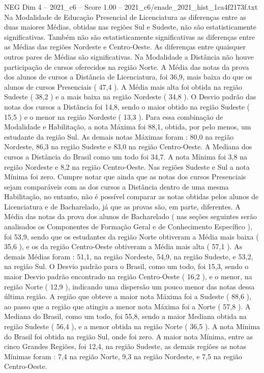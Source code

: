 \begin{textsample}{NEG Dim 4 – 2021\_c6 – Score 1.00 – 2021\_c6/enade\_2021\_hist\_1ca4f2173f.txt}
Na Modalidade de Educação Presencial de Licenciatura as diferenças entre as duas maiores Médias, obtidas nas regiões Sul e Sudeste, não são estatisticamente significativas.
Também não são estatisticamente significativas as diferenças entre as Médias das regiões Nordeste e Centro-Oeste.
As diferenças entre quaisquer outros pares de Médias são significativas.
Na Modalidade a Distância não houve participação de cursos oferecidos na região Norte.
A Média das notas da prova dos alunos de cursos a Distância de Licenciatura, foi 36,9, mais baixa do que os alunos de cursos Presenciais ( 47,4 ).
A Média mais alta foi obtida na região Sudeste ( 38,2 ) e a mais baixa na região Nordeste ( 34,8 ).
O Desvio padrão das notas dos cursos a Distância foi 14,8, sendo o maior obtido na região Sudeste ( 15,5 ) e o menor na região Nordeste ( 13,3 ).
Para essa combinação de Modalidade e Habilitação, a nota Máxima foi 88,1, obtida, por pelo menos, um estudante da região Sul.
As demais notas Máximas foram : 80,0 na região Nordeste, 86,3 na região Sudeste e 83,0 na região Centro-Oeste.
A Mediana dos cursos a Distância do Brasil como um todo foi 34,7.
A nota Mínima foi 3,8 na região Nordeste e 8,2 na região Centro-Oeste.
Nas regiões Sudeste e Sul a nota Mínima foi zero.
Cumpre notar que ainda que as notas dos cursos Presenciais sejam comparáveis com as dos cursos a Distância dentro de uma mesma Habilitação, no entanto, não é possível comparar as notas obtidas pelos alunos de Licenciatura e de Bacharelado, já que as provas são, em parte, diferentes.
A Média das notas da prova dos alunos de Bacharelado ( nas seções seguintes serão analisados os Componentes de Formação Geral e de Conhecimento Específico ), foi 53,9, sendo que os estudantes da região Norte obtiveram a Média mais baixa ( 35,6 ), e os da região Centro-Oeste obtiveram a Média mais alta ( 57,1 ).
As demais Médias foram : 51,1, na região Nordeste, 54,9, na região Sudeste, e 53,2, na região Sul.
O Desvio padrão para o Brasil, como um todo, foi 15,3, sendo o maior Desvio padrão encontrado na região Centro-Oeste ( 16,2 ), e o menor, na região Norte ( 12,9 ), indicando uma dispersão um pouco menor das notas dessa última região.
A região que obteve a maior nota Máxima foi a Sudeste ( 88,6 ), ao passo que a região que atingiu a menor nota Máxima foi a Norte ( 57,8 ).
A Mediana do Brasil, como um todo, foi 55,8, sendo a maior Mediana obtida na região Sudeste ( 56,4 ), e a menor obtida na região Norte ( 36,5 ).
A nota Mínima do Brasil foi obtida na região Sul, onde foi zero.
A maior nota Mínima, entre as cinco Grandes Regiões, foi 12,4, na região Sudeste, as demais regiões as notas Mínimas foram : 7,4 na região Norte, 9,3 na região Nordeste, e 7,5 na região Centro-Oeste.

\end{textsample}
